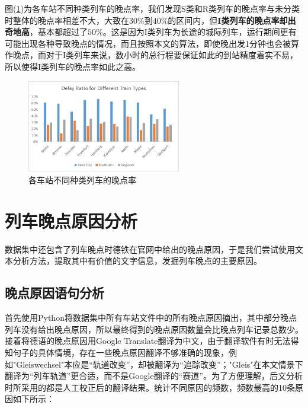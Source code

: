 \documentclass[lang=cn,12pt,a4paper,cite=authoryear]{elegantpaper}
\begin{document}
图(\ref{fig6})为各车站不同种类列车的晚点率，我们发现S类和R类列车的晚点率与未分类时整体的晚点率相差不大，大致在$30\%$到$40\%$的区间内，但\textbf{I类列车的晚点率却出奇地高}，基本都超过了$50\%$。这是因为I类列车为长途的城际列车，运行期间更有可能出现各种导致晚点的情况，而且按照本文的算法，即使晚出发1分钟也会被算作晚点，而对于I类列车来说，数小时的总行程要保证如此的到站精度着实不易，所以使得I类列车的晚点率如此之高。

\begin{figure}[H]
	\centering
	\includegraphics[width=0.6\textwidth]{image/ratio_type.png}
	\caption{各车站不同种类列车的晚点率}
	\label{fig6}
\end{figure}


\section{列车晚点原因分析}

数据集中还包含了列车晚点时德铁在官网中给出的晚点原因，于是我们尝试使用文本分析方法，提取其中有价值的文字信息，发掘列车晚点的主要原因。

\subsection{晚点原因语句分析}

首先使用Python将数据集中所有车站文件中的所有晚点原因摘出，其中部分晚点列车没有给出晚点原因，所以最终得到的晚点原因数量会比晚点列车记录总数少。接着将德语的晚点原因用Google Translate翻译为中文，由于翻译软件有时无法得知句子的具体情境，存在一些晚点原因翻译不够准确的现象，例如"Gleiswechsel"本应是“轨道改变”，却被翻译为“追踪改变”；"Gleis"在本文情景下翻译为“列车轨道”更合适，而不是Google翻译的“赛道”。为了方便理解，后文分析时所采用的都是人工校正后的翻译结果。统计不同原因的频数，频数最高的10条原因如下所示：
\end{document}
